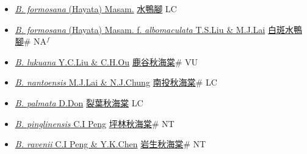 \begin{itemize}
\begin{itemize}
        \item[] \href{http://www.theplantlist.org/tpl1.1/search?q=Begonia+formosana}{\textit{B. formosana} (Hayata) Masam.}   \href{\detokenize{http://taibnet.sinica.edu.tw/chi/taibnet_species_list.php?T2=水鴨腳&T2_new_value=true&fr=y}}{水鴨腳} LC
        \item[] \href{http://www.theplantlist.org/tpl1.1/search?q=Begonia+formosana+ f. +albomaculata}{\textit{B. formosana} (Hayata) Masam.  f.  \textit{albomaculata} T.S.Liu \& M.J.Lai}   \href{\detokenize{http://taibnet.sinica.edu.tw/chi/taibnet_species_list.php?T2=白斑水鴨腳&T2_new_value=true&fr=y}}{白斑水鴨腳}\# NA$^f$
        \item[] \href{http://www.theplantlist.org/tpl1.1/search?q=Begonia+lukuana}{\textit{B. lukuana} Y.C.Liu \& C.H.Ou}   \href{\detokenize{http://taibnet.sinica.edu.tw/chi/taibnet_species_list.php?T2=鹿谷秋海棠&T2_new_value=true&fr=y}}{鹿谷秋海棠}\# VU
        \item[] \href{http://www.theplantlist.org/tpl1.1/search?q=Begonia+nantoensis}{\textit{B. nantoensis} M.J.Lai \& N.J.Chung}   \href{\detokenize{http://taibnet.sinica.edu.tw/chi/taibnet_species_list.php?T2=南投秋海棠&T2_new_value=true&fr=y}}{南投秋海棠}\# LC
        \item[] \href{http://www.theplantlist.org/tpl1.1/search?q=Begonia+palmata}{\textit{B. palmata} D.Don}   \href{\detokenize{http://taibnet.sinica.edu.tw/chi/taibnet_species_list.php?T2=裂葉秋海棠&T2_new_value=true&fr=y}}{裂葉秋海棠} LC
        \item[] \href{http://www.theplantlist.org/tpl1.1/search?q=Begonia+pinglinensis}{\textit{B. pinglinensis} C.I Peng}   \href{\detokenize{http://taibnet.sinica.edu.tw/chi/taibnet_species_list.php?T2=坪林秋海棠&T2_new_value=true&fr=y}}{坪林秋海棠}\# NT
        \item[] \href{http://www.theplantlist.org/tpl1.1/search?q=Begonia+ravenii}{\textit{B. ravenii} C.I Peng \& Y.K.Chen}   \href{\detokenize{http://taibnet.sinica.edu.tw/chi/taibnet_species_list.php?T2=岩生秋海棠&T2_new_value=true&fr=y}}{岩生秋海棠}\# NT

\end{itemize}
\end{itemize}
